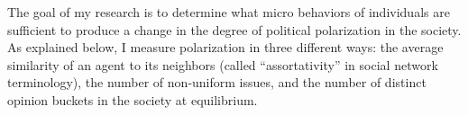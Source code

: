 The goal of my research is to determine what micro behaviors of individuals
are sufficient to produce a change in the degree of political polarization in
the society. As explained below, I measure polarization in three
different ways: the average similarity of an agent to its neighbors (called
``assortativity'' in social network terminology), the number of non-uniform issues, and the number of distinct opinion buckets in the society at equilibrium.
